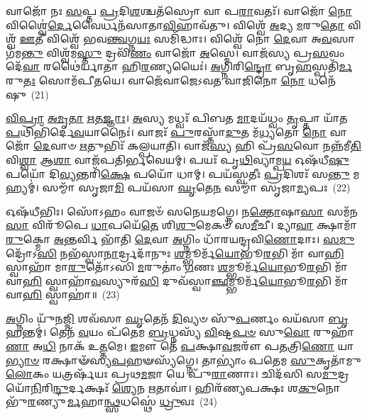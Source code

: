 {\anuvakamend[{𑌤𑍍𑌰𑌯᳴𑌸𑍍𑌤𑍍𑌰𑌿𑍞𑌶\-\ul{𑌚𑍍𑌚} 𑌵𑍍𑌯𑌶𑍍𑌞𑌿᳴\-\ul{𑌯} 𑌏𑌕𑌾᳴\-𑌦𑌶 𑌚}]}%

𑌵𑌾𑌜𑍋᳴ 𑌨𑌃 \ul{𑌸}\-𑌪𑍍𑌤 \ul{𑌪𑍍𑌰}\-𑌦𑌿\-\ul{𑌶}\-𑌶𑍍𑌚𑌤᳴𑌸𑍍𑌰𑍋 𑌵𑌾 𑌪\-\ul{𑌰𑌾}\-𑌵𑌤𑌃᳴। 𑌵𑌾𑌜𑍋᳴ \ul{𑌨𑍋} 𑌵𑌿𑌶𑍍𑌵𑍈॑\-\ul{𑌰𑍍𑌦𑍇}\-𑌵𑍈𑌰𑍍𑌧𑌨᳴𑌸𑌾𑌤𑌾\-\ul{𑌵𑌿}\-𑌹𑌾𑌵᳴𑌤𑍁। 𑌵𑌿𑌶𑍍𑌵𑍇᳴ \ul{𑌅}\-𑌦𑍍𑌯 \ul{𑌮}\-𑌰𑍁\-\ul{𑌤𑍋} 𑌵𑌿𑌶𑍍𑌵᳴ \ul{𑌊}\-𑌤𑍀 𑌵𑌿𑌶𑍍𑌵𑍇᳴ 𑌭𑌵\-\ul{𑌨𑍍𑌤𑍍𑌵}\-𑌗𑍍𑌨\-\ul{𑌯𑌃} 𑌸𑌮𑌿᳴𑌦𑍍𑌧𑌾𑌃। 𑌵𑌿𑌶𑍍𑌵𑍇᳴ 𑌨𑍋 \ul{𑌦𑍇}\-𑌵𑌾 𑌅\-\ul{𑌵}\-𑌸𑌾 𑌗᳴𑌮\-\ul{𑌨𑍍𑌤𑍁} 𑌵𑌿𑌶𑍍𑌵᳴𑌮\-\ul{𑌸𑍍𑌤𑍁} 𑌦𑍍𑌰𑌵𑌿᳴\-\ul{𑌣𑌂} 𑌵𑌾𑌜𑍋᳴ \ul{𑌅}\-𑌸𑍍𑌮𑍇। 𑌵𑌾𑌜᳴𑌸𑍍𑌯 𑌪𑍍𑌰\-\ul{𑌸}\-𑌵𑌂 𑌦𑍇᳴\-\ul{𑌵𑌾} 𑌰𑌥𑍈॑𑌰𑍍𑌯𑌾𑌤𑌾 𑌹𑌿\-\ul{𑌰}\-𑌣𑍍𑌯𑌯𑍈𑌃॑। \ul{𑌅}\-𑌗𑍍𑌨𑌿𑌰𑌿\-\ul{𑌨𑍍𑌦𑍍𑌰𑍋} 𑌬𑍃\-\ul{𑌹}\-𑌸𑍍𑌪𑌤𑌿᳴\-\ul{𑌰𑍍𑌮}\-𑌰𑍁\-\ul{𑌤𑌃} 𑌸𑍋𑌮᳴𑌪𑍀𑌤𑌯𑍇। 𑌵𑌾𑌜𑍇᳴𑌵𑌾𑌜𑍇\-𑌽𑌵𑌤 𑌵𑌾𑌜𑌿𑌨𑍋 \ul{𑌨𑍋} 𑌧𑌨𑍇᳴𑌷𑍁~(21)

\-\ul{𑌵𑌿}\-\-\ul{𑌪𑍍𑌰𑌾} \ul{𑌅}\-\-\ul{𑌮𑍃}\-\-\ul{𑌤𑌾} \ul{𑌋}\-\-\ul{𑌤}\-\-\ul{𑌜𑍍𑌞𑌾𑌃}\-। \ul{𑌅}\-𑌸𑍍𑌯 𑌮𑌧𑍍𑌵𑌃᳴ 𑌪𑌿𑌬𑌤 \ul{𑌮𑌾}\-𑌦𑌯᳴𑌧𑍍𑌵𑌂 \ul{𑌤𑍃}\-𑌪𑍍𑌤𑌾 𑌯𑌾᳴𑌤 \ul{𑌪}\-𑌥𑌿𑌭𑌿᳴𑌰𑍍𑌦𑍇\-\ul{𑌵}\-𑌯𑌾𑌨𑍈𑌃॑। 𑌵𑌾𑌜𑌃᳴ \ul{𑌪𑍁}\-𑌰𑌸𑍍𑌤𑌾᳴\-\ul{𑌦𑍁}\-𑌤 𑌮᳴\-\ul{𑌧𑍍𑌯}\-𑌤𑍋 \ul{𑌨𑍋} 𑌵𑌾𑌜𑍋᳴ \ul{𑌦𑍇}\-𑌵𑌾𑍞 \ul{𑌋}\-𑌤𑍁𑌭𑌿𑌃᳴ 𑌕𑌲𑍍𑌪𑌯𑌾𑌤𑌿। 𑌵𑌾𑌜᳴\-\ul{𑌸𑍍𑌯} 𑌹𑌿 𑌪𑍍𑌰᳴\-\ul{𑌸}\-𑌵𑍋 𑌨𑌨𑍍𑌨᳴𑌮𑍀\-\ul{𑌤𑌿} 𑌵𑌿\-\ul{𑌶𑍍𑌵𑌾} 𑌆\-\ul{𑌶𑌾} 𑌵𑌾𑌜᳴𑌪𑌤𑌿𑌰𑍍𑌭𑌵𑍇𑌯𑌮𑍍। 𑌪𑌯𑌃᳴ 𑌪𑍃\-\ul{𑌥𑌿}\-𑌵𑍍𑌯𑌾𑌮𑍍𑌪\-\ul{𑌯} 𑌓𑌷᳴𑌧𑍀\-\ul{𑌷𑍁} 𑌪𑌯𑍋᳴ 𑌦𑌿\-\ul{𑌵𑍍𑌯}\-𑌨𑍍𑌤𑌰𑌿᳴\-\ul{𑌕𑍍𑌷𑍇} 𑌪𑌯𑍋᳴ 𑌧𑌾𑌮𑍍। 𑌪𑌯᳴𑌸𑍍𑌵𑌤𑍀𑌃 \ul{𑌪𑍍𑌰}\-𑌦𑌿𑌶𑌃᳴ 𑌸\-\ul{𑌨𑍍𑌤𑍁} 𑌮𑌹𑍍𑌯𑌮𑍍॑। 𑌸𑌮𑍍𑌮𑌾᳴ 𑌸𑍃𑌜𑌾\-\ul{𑌮𑌿} 𑌪𑌯᳴𑌸𑌾 \ul{𑌘𑍃}\-𑌤𑍇\-\ul{𑌨} 𑌸𑌮𑍍𑌮𑌾᳴ 𑌸𑍃𑌜𑌾\-\ul{𑌮𑍍𑌯}\-𑌪𑌃~(22)

𑌓𑌷᳴𑌧𑍀𑌭𑌿𑌃। 𑌸𑍋᳴\-𑌽𑌹𑌂 𑌵𑌾𑌜𑍞᳴ 𑌸𑌨𑍇𑌯𑌮𑌗𑍍𑌨𑍇। 𑌨\-\ul{𑌕𑍍𑌤𑍋}\-𑌷𑌾\-\ul{𑌸𑌾} 𑌸𑌮᳴𑌨\-\ul{𑌸𑌾} 𑌵𑌿𑌰𑍂᳴𑌪𑍇 \ul{𑌧𑌾}\-𑌪𑌯𑍇᳴\-\ul{𑌤𑍇} 𑌶𑌿\-\ul{𑌶𑍁}\-𑌮𑍇𑌕𑍞᳴ 𑌸\-\ul{𑌮𑍀}\-𑌚𑍀। 𑌦𑍍𑌯𑌾\-\ul{𑌵𑌾} 𑌕𑍍𑌷𑌾𑌮𑌾᳴ \ul{𑌰𑍁}\-𑌕𑍍𑌮𑍋 \ul{𑌅}\-𑌨𑍍𑌤𑌰𑍍𑌵𑌿 𑌭𑌾᳴𑌤𑌿 \ul{𑌦𑍇}\-𑌵𑌾 \ul{𑌅}\-𑌗𑍍𑌨𑌿𑌂 𑌧𑌾᳴𑌰𑌯𑌨𑍍𑌦𑍍𑌰𑌵𑌿\-\ul{𑌣𑍋}\-𑌦𑌾𑌃। \ul{𑌸}\-\-\ul{𑌮𑍁}\-𑌦𑍍𑌰𑍋᳴\-𑌽\-\ul{𑌸𑌿} 𑌨𑌭᳴𑌸𑍍𑌵𑌾\-\ul{𑌨𑌾}\-𑌰𑍍𑌦𑍍𑌰𑌦𑌾᳴𑌨𑍁𑌃 \ul{𑌶}\-𑌮𑍍𑌭𑍂𑌰𑍍𑌮᳴\-\ul{𑌯𑍋}\-𑌭𑍂\-\ul{𑌰}\-𑌭𑌿 𑌮𑌾᳴ 𑌵𑌾\-\ul{𑌹𑌿} 𑌸𑍍𑌵𑌾𑌹𑌾᳴ 𑌮𑌾\-\ul{𑌰𑍁}\-𑌤𑍋᳴\-𑌽𑌸𑌿 \ul{𑌮}\-𑌰𑍁𑌤𑌾𑌂॑ \ul{𑌗}\-𑌣𑌃 \ul{𑌶}\-𑌮𑍍𑌭𑍂𑌰𑍍𑌮᳴\-\ul{𑌯𑍋}\-𑌭𑍂\-\ul{𑌰}\-𑌭𑌿 𑌮𑌾᳴ 𑌵𑌾\-\ul{𑌹𑌿} 𑌸𑍍𑌵𑌾𑌹𑌾᳴\-\ul{𑌵}\-𑌸𑍍𑌯𑍁𑌰᳴\-\ul{𑌸𑌿} 𑌦𑍁𑌵᳴𑌸𑍍𑌵𑌾\-\ul{𑌞𑍍𑌛}\-𑌮𑍍𑌭𑍂𑌰𑍍𑌮᳴\-\ul{𑌯𑍋}\-𑌭𑍂\-\ul{𑌰}\-𑌭𑌿 𑌮𑌾᳴ 𑌵𑌾\-\ul{𑌹𑌿} 𑌸𑍍𑌵𑌾𑌹𑌾॑॥~(23)

{\anuvakamend[{𑌧𑌨𑍇॑\-\ul{𑌷𑍍𑌵}\-𑌪𑍋 𑌦𑍁𑌵᳴𑌸𑍍𑌵𑌾\-\ul{𑌞𑍍𑌛}\-𑌮𑍍𑌭𑍂𑌰𑍍𑌮᳴\-\ul{𑌯𑍋}\-𑌭𑍂\-\ul{𑌰}\-𑌭𑌿 \ul{𑌮𑌾} 𑌦𑍍𑌵𑍇 𑌚᳴}]}%

\-\ul{𑌅}\-𑌗𑍍𑌨𑌿𑌂 𑌯𑍁᳴𑌨\-\ul{𑌜𑍍𑌮𑌿} 𑌶𑌵᳴𑌸𑌾 \ul{𑌘𑍃}\-𑌤𑍇𑌨᳴ \ul{𑌦𑌿}\-𑌵𑍍𑌯𑍞 𑌸𑍁᳴\-\ul{𑌪}\-𑌰𑍍𑌣𑌂 𑌵𑌯᳴𑌸𑌾 \ul{𑌬𑍃}\-𑌹𑌨𑍍𑌤𑌮𑍍॑। 𑌤𑍇𑌨᳴ \ul{𑌵}\-𑌯𑌂 𑌪᳴𑌤𑍇𑌮 \ul{𑌬𑍍𑌰}\-𑌧𑍍𑌨𑌸𑍍𑌯᳴ \ul{𑌵𑌿}\-𑌷𑍍𑌟\-\ul{𑌪}\-\-\ul{𑍞} 𑌸𑍁\-\ul{𑌵𑍋} 𑌰𑍁𑌹𑌾᳴\-\ul{𑌣𑌾} 𑌅\-\ul{𑌧𑌿} 𑌨𑌾𑌕᳴ 𑌉\-\ul{𑌤𑍍𑌤}\-𑌮𑍇। \ul{𑌇}\-𑌮𑍗 𑌤𑍇᳴ \ul{𑌪}\-𑌕𑍍𑌷𑌾\-\ul{𑌵}\-𑌜𑌰𑍗᳴ 𑌪\-\ul{𑌤}\-𑌤𑍍𑌰𑌿\-\ul{𑌣𑍋} 𑌯𑌾\-\ul{𑌭𑍍𑌯𑌾}\-\-\ul{𑍞} 𑌰𑌕𑍍𑌷𑌾𑍟᳴𑌸𑍍𑌯\-\ul{𑌪}\-𑌹𑍟𑌸𑍍𑌯᳴𑌗𑍍𑌨𑍇। 𑌤𑌾\-𑌭𑍍𑌯𑌾𑌂॑ 𑌪𑌤𑍇𑌮 \ul{𑌸𑍁}\-𑌕𑍃𑌤𑌾᳴𑌮𑍁 \ul{𑌲𑍋}\-𑌕𑌂 𑌯𑌤𑍍𑌰𑌰𑍍\mbox{}𑌷᳴𑌯𑌃 𑌪𑍍𑌰𑌥\-\ul{𑌮}\-𑌜𑌾 𑌯𑍇 𑌪𑍁᳴\-\ul{𑌰𑌾}\-𑌣𑌾𑌃। 𑌚𑌿𑌦᳴𑌸𑌿 𑌸\-\ul{𑌮𑍁}\-𑌦𑍍𑌰𑌯𑍋᳴\-\ul{𑌨𑌿}\-𑌰𑌿\-\ul{𑌨𑍍𑌦𑍁}\-𑌰𑍍𑌦𑌕𑍍𑌷𑌃᳴ \ul{𑌶𑍍𑌯𑍇}\-𑌨 \ul{𑌋}\-𑌤𑌾𑌵𑌾॑। 𑌹𑌿𑌰᳴𑌣𑍍𑌯𑌪𑌕𑍍𑌷𑌃 𑌶\-\ul{𑌕𑍁}\-𑌨𑍋 𑌭𑍁᳴\-\ul{𑌰}\-𑌣𑍍𑌯𑍁\-\ul{𑌰𑍍𑌮}\-𑌹𑌾\-\ul{𑌨𑍍𑌥𑍍𑌸}\-𑌧𑌸𑍍𑌥𑍇॑ \ul{𑌧𑍍𑌰𑍁}\-𑌵𑌃~(24)

